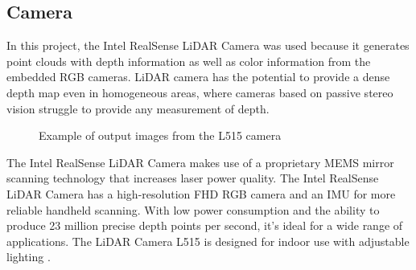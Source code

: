 \subsection{Camera\label{subsec:camera}} 
In this project, the Intel RealSense LiDAR Camera was used because it generates point clouds with depth information as well as color information from the embedded RGB cameras. LiDAR camera has the potential to provide a dense depth map even in homogeneous areas, where cameras based on passive stereo vision struggle to provide any measurement of depth. 
\begin{figure}[h]
 \centering
 \hfill
 \hfill
 \caption{Example of output images from the L515 camera}
 \label{figure: lidar}
\end{figure}


The Intel RealSense LiDAR Camera makes use of a proprietary MEMS mirror scanning technology that increases laser power quality. The Intel RealSense LiDAR Camera has a high-resolution FHD RGB camera and an IMU for more reliable handheld scanning. With low power consumption and the ability to produce 23 million precise depth points per second, it's ideal for a wide range of applications. The LiDAR Camera L515 is designed for indoor use with adjustable lighting \cite{noauthor_intel_nodate}.


